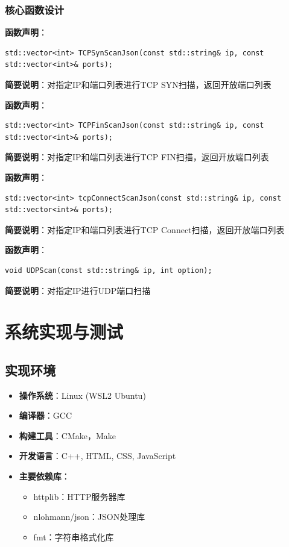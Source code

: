 \documentclass[12pt,hyperref,a4paper,UTF8]{ctexart}
\begin{document}
\subsubsection{核心函数设计}

\textbf{函数声明}：
\begin{verbatim}
std::vector<int> TCPSynScanJson(const std::string& ip, const std::vector<int>& ports);
\end{verbatim}
\textbf{简要说明}：对指定IP和端口列表进行TCP SYN扫描，返回开放端口列表

\textbf{函数声明}：
\begin{verbatim}
std::vector<int> TCPFinScanJson(const std::string& ip, const std::vector<int>& ports);
\end{verbatim}
\textbf{简要说明}：对指定IP和端口列表进行TCP FIN扫描，返回开放端口列表

\textbf{函数声明}：
\begin{verbatim}
std::vector<int> tcpConnectScanJson(const std::string& ip, const std::vector<int>& ports);
\end{verbatim}
\textbf{简要说明}：对指定IP和端口列表进行TCP Connect扫描，返回开放端口列表

\textbf{函数声明}：
\begin{verbatim}
void UDPScan(const std::string& ip, int option);
\end{verbatim}
\textbf{简要说明}：对指定IP进行UDP端口扫描

\section{系统实现与测试}

\subsection{实现环境}
\begin{itemize}
    \item \textbf{操作系统}：Linux (WSL2 Ubuntu)
    \item \textbf{编译器}：GCC
    \item \textbf{构建工具}：CMake，Make
    \item \textbf{开发语言}：C++, HTML, CSS, JavaScript
    \item \textbf{主要依赖库}：
    \begin{itemize}
        \item httplib：HTTP服务器库
        \item nlohmann/json：JSON处理库
        \item fmt：字符串格式化库
    \end{itemize}
\end{itemize}
\end{document}
